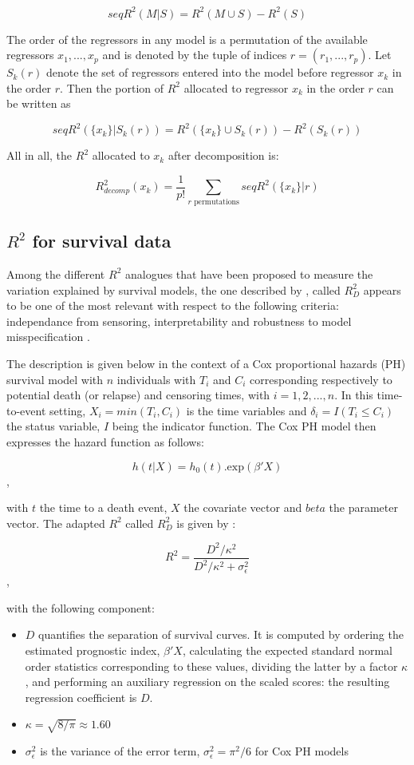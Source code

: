 \documentclass[a4paper,12pt,twoside,onecolumn,openright,final,oldfontcommands]{memoir}
\providecommand{\tightlist}{%
  \setlength{\itemsep}{0pt}\setlength{\parskip}{0pt}}
\begin{document}
\[seqR^2(M|S)=R^2(M\cup S)-R^2(S)\]

The order of the regressors in any model is a permutation of the
available regressors \(x_1, ..., x_p\) and is denoted by the tuple of
indices \(r = (r_1, ..., r_p)\). Let \(S_k(r)\) denote the set of
regressors entered into the model before regressor \(x_k\) in the order
\(r\). Then the portion of \(R^2\) allocated to regressor \(x_k\) in the
order \(r\) can be written as

\[seqR^2(\{x_k\}|S_k(r))=R^2(\{x_k\}\cup S_k(r))-R^2(S_k(r))\]

All in all, the \(R^2\) allocated to \(x_k\) after decomposition is:

\[R^2_{decomp}(x_k)=\dfrac{1}{p!}\sum_{r\text{ permutations}}seqR^2(\{x_k\}|r)\]

\subsection{\texorpdfstring{\(R^2\) for survival
data}{R\^{}2 for survival data}}\label{appendix-r2surv}

Among the different \(R^2\) analogues that have been proposed to measure
the variation explained by survival models, the one described by
\citet{royston2004new}, called \(R^2_D\) appears to be one of the most
relevant with respect to the following criteria: independance from
sensoring, interpretability and robustness to model misspecification
\citep{choodari2012simulation}.

The description is given below in the context of a Cox proportional
hazards (PH) survival model with \(n\) individuals with \(T_i\) and
\(C_i\) corresponding respectively to potential death (or relapse) and
censoring times, with \(i=1,2,...,n\). In this time-to-event setting,
\(X_i=min(T_i,C_i)\) is the time variables and
\(\delta_i=I(T_i \leq C_i)\) the status variable, \(I\) being the
indicator function. The Cox PH model then expresses the hazard function
as follows:

\[h(t|X)=h_0(t).\text{exp}(\beta'X)\],

with \(t\) the time to a death event, \(X\) the covariate vector and
\(beta\) the parameter vector. The adapted \(R^2\) called \(R^2_D\) is
given by \citep{royston2006explained}:

\[R^2=\dfrac{D^2/\kappa^2}{D^2/\kappa^2 + \sigma^2_{\epsilon}}\],

with the following component:

\begin{itemize}
\tightlist
\item
  \(D\) quantifies the separation of survival curves. It is computed by
  ordering the estimated prognostic index, \(\beta'X\), calculating the
  expected standard normal order statistics corresponding to these
  values, dividing the latter by a factor \(\kappa\), and performing an
  auxiliary regression on the scaled scores: the resulting regression
  coefficient is \(D\).
\item
  \(\kappa=\sqrt{8/\pi}\approx 1.60\) \citep{royston2004new}
\item
  \(\sigma^2_{\epsilon}\) is the variance of the error term,
  \(\sigma^2_{\epsilon}=\pi^2/6\) for Cox PH models
\end{itemize}
\end{document}
